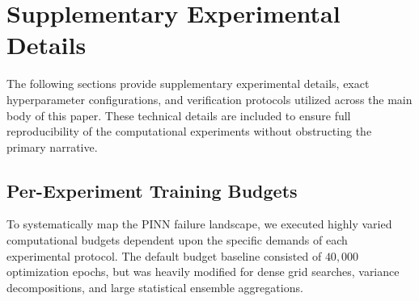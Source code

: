 \appendix
\section{Supplementary Experimental Details}
\label{app:configs}

The following sections provide supplementary experimental details, exact hyperparameter configurations, and verification protocols utilized across the main body of this paper. These technical details are included to ensure full reproducibility of the computational experiments without obstructing the primary narrative.

\subsection{Per-Experiment Training Budgets}

To systematically map the PINN failure landscape, we executed highly varied computational budgets dependent upon the specific demands of each experimental protocol. The default budget baseline consisted of $40,000$ optimization epochs, but was heavily modified for dense grid searches, variance decompositions, and large statistical ensemble aggregations.

